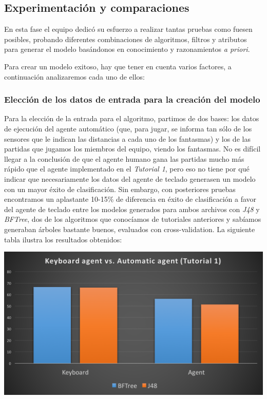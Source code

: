 \documentclass[12pt]{article}
\begin{document}
\newpage
\subsection{Experimentación y comparaciones}

En esta fase el equipo dedicó su esfuerzo a realizar tantas pruebas como fuesen posibles, probando diferentes combinaciones de algoritmos, filtros y atributos para generar el modelo basándonos en conocimiento y razonamientos \emph{a priori}.

\vspace{0.2cm}

Para crear un modelo exitoso, hay que tener en cuenta varios factores, a continuación analizaremos cada uno de ellos:

\subsubsection{Elección de los datos de entrada para la creación del modelo}

Para la elección de la entrada para el algoritmo, partimos de dos bases: los datos de ejecución del agente automático (que, para jugar, se informa tan sólo de los sensores que le indican las distancias a cada uno de los fantasmas) y los de las partidas que jugamos los miembros del equipo, viendo los fantasmas. No es difícil llegar a la conclusión de que el agente humano gana las partidas mucho más rápido que el agente implementado en el \emph{Tutorial 1}, pero eso no tiene por qué indicar que necesariamente los datos del agente de teclado generasen un modelo con un mayor éxito de clasificación. Sin embargo, con posteriores pruebas encontramos un aplastante 10-15\% de diferencia en éxito de clasificación a favor del agente de teclado entre los modelos generados para ambos archivos con \emph{J48} y \emph{BFTree}, dos de los algoritmos que conocíamos de tutoriales anteriores y sabíamos generaban árboles bastante buenos, evaluados con cross-validation. La siguiente tabla ilustra los resultados obtenidos:

\begin{center} \includegraphics[width=14cm]{kb_vs_aa} \end{center}
\end{document}

